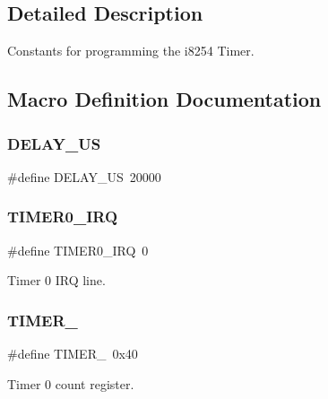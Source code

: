 \subsection{Detailed Description}
Constants for programming the i8254 Timer. 

\subsection{Macro Definition Documentation}
\hypertarget{group__i8254_ga1a522aa19bcb695a9df30032a893bee3}{}\label{group__i8254_ga1a522aa19bcb695a9df30032a893bee3} 
\subsubsection{\texorpdfstring{D\+E\+L\+A\+Y\+\_\+\+US}{DELAY\_US}}
{\footnotesize\ttfamily \#define D\+E\+L\+A\+Y\+\_\+\+US~20000}

\hypertarget{group__i8254_ga30bf84c312af248cb81bb224e09f9ba8}{}\label{group__i8254_ga30bf84c312af248cb81bb224e09f9ba8} 
\subsubsection{\texorpdfstring{T\+I\+M\+E\+R0\+\_\+\+I\+RQ}{TIMER0\_IRQ}}
{\footnotesize\ttfamily \#define T\+I\+M\+E\+R0\+\_\+\+I\+RQ~0}



Timer 0 I\+RQ line. 

\hypertarget{group__i8254_gacc9ff9df4a9674a1ce9ba08fc4a4679e}{}\label{group__i8254_gacc9ff9df4a9674a1ce9ba08fc4a4679e} 
\subsubsection{\texorpdfstring{T\+I\+M\+E\+R\+\_}{TIMER\_0}}
{\footnotesize\ttfamily \#define T\+I\+M\+E\+R\+\_~0x40}



Timer 0 count register. 

\hypertarget{group__i8254_ga282832448fb0281ef53d243c1cd48491}{}\label{group__i8254_ga282832448fb0281ef53d243c1cd48491} 
